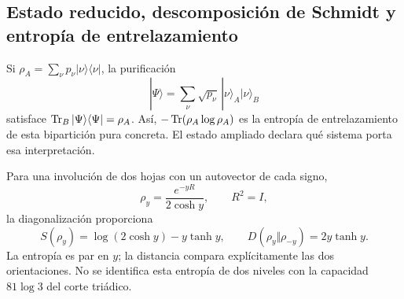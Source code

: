 

\subsection{Estado reducido, descomposición de Schmidt y entropía de entrelazamiento}
Si $\rho_A=\sum_\nu p_\nu|\nu\rangle\langle\nu|$,
la purificación
\[
|\Psi\rangle=\sum_\nu\sqrt{p_\nu}\,
|\nu\rangle_A|\nu\rangle_B
\]
satisface $\operatorname{Tr}_B|\Psi\rangle\langle\Psi|=\rho_A$.
Así, $-\operatorname{Tr}(\rho_A\log\rho_A)$ es la entropía de entrelazamiento
de esta bipartición pura concreta. El estado ampliado declara
qué sistema porta esa interpretación.

Para una involución de dos hojas con un autovector de cada signo,
\[
\rho_y=\frac{e^{-yR}}{2\cosh y},\qquad R^2=I,
\]
la diagonalización proporciona
\[
S(\rho_y)=\log(2\cosh y)-y\tanh y,\qquad
D(\rho_y\Vert\rho_{-y})=2y\tanh y.
\]
La entropía es par en $y$; la distancia compara explícitamente
las dos orientaciones. No se identifica esta entropía de dos niveles
con la capacidad $81\log3$ del corte triádico.
